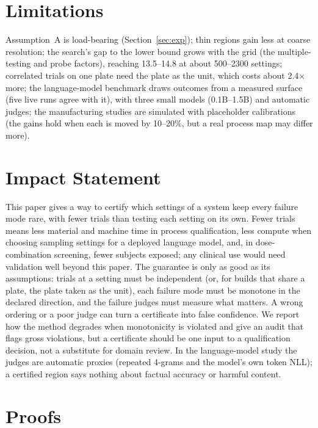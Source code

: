 \documentclass{article}
\newif\ificmlstyle
\begin{document}
\section{Limitations}

Assumption~A is load-bearing (Section~\ref{sec:exp}); thin regions gain
less at coarse resolution; the search's gap to the lower bound grows with
the grid (the multiple-testing and probe factors), reaching 13.5--14.8
at about 500--2300 settings; correlated trials on one plate need the
plate as the unit, which costs about 2.4$\times$ more; the language-model benchmark draws outcomes from
a measured surface (five live runs agree with it), with three small models (0.1B--1.5B) and
automatic judges; the manufacturing studies are simulated with
placeholder calibrations (the gains hold when each is moved by 10--20\%,
but a real process map may differ more).

\section*{Impact Statement}

This paper gives a way to certify which settings of a system keep every
failure mode rare, with fewer trials than testing each setting on its own.
Fewer trials means less material and machine time in process
qualification, less compute when choosing sampling settings for a deployed
language model, and, in dose-combination screening, fewer subjects exposed;
any clinical use would need validation well beyond this paper. The
guarantee is only as good as its assumptions: trials at a setting must be
independent (or, for builds that share a plate, the plate taken as the
unit), each failure mode must be monotone in the declared
direction, and the failure judges must measure what matters. A wrong
ordering or a poor judge can turn a certificate into false confidence.
We report how the method degrades when monotonicity is violated and give
an audit that flags gross violations, but a certificate should be one
input to a qualification decision, not a substitute for domain review. In
the language-model study the judges are automatic proxies (repeated
4-grams and the model's own token NLL); a certified region says nothing
about factual accuracy or harmful content.

\ificmlstyle\else\fi


\appendix
\onecolumn
\section{Proofs}\label{app:theory}
\end{document}
